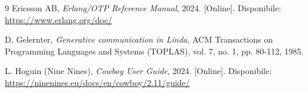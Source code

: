 \documentclass{article}
\begin{document}
\begin{thebibliography}{9}
Ericsson AB, \textit{Erlang/OTP Reference Manual}, 2024. [Online]. Disponibile: \url{https://www.erlang.org/doc/}

D. Gelernter, \textit{Generative communication in Linda}, ACM Transactions on Programming Languages and Systems (TOPLAS), vol. 7, no. 1, pp. 80-112, 1985.

L. Hoguin (Nine Nines), \textit{Cowboy User Guide}, 2024. [Online]. Disponibile: \url{https://ninenines.eu/docs/en/cowboy/2.11/guide/}

\end{thebibliography}
\end{document}
